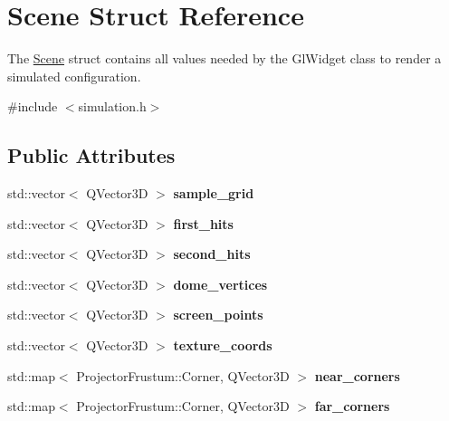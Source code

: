 \hypertarget{class_scene}{}\section{Scene Struct Reference}
\label{class_scene}


The \mbox{\hyperlink{class_scene}{Scene}} struct contains all values needed by the Gl\+Widget class to render a simulated configuration.  




{\ttfamily \#include $<$simulation.\+h$>$}

\subsection*{Public Attributes}
\begin{DoxyCompactItemize}
\item 
\mbox{\label{class_scene_ac73d19d8cf3309348b3302c607404b73}} 
std\+::vector$<$ Q\+Vector3D $>$ {\bfseries sample\+\_\+grid}
\item 
\mbox{\label{class_scene_ae9ef639317ddd27e4073a33b23e62810}} 
std\+::vector$<$ Q\+Vector3D $>$ {\bfseries first\+\_\+hits}
\item 
\mbox{\label{class_scene_acff925f0a3de398bcbeca5f51a32395c}} 
std\+::vector$<$ Q\+Vector3D $>$ {\bfseries second\+\_\+hits}
\item 
\mbox{\label{class_scene_aed6376924dbd14c550452dc9c8ba0341}} 
std\+::vector$<$ Q\+Vector3D $>$ {\bfseries dome\+\_\+vertices}
\item 
\mbox{\label{class_scene_a594e36de7f91ec97a3e9d08e05a339af}} 
std\+::vector$<$ Q\+Vector3D $>$ {\bfseries screen\+\_\+points}
\item 
\mbox{\label{class_scene_a6aacb490dbf456d4c5c4b6099aa10170}} 
std\+::vector$<$ Q\+Vector3D $>$ {\bfseries texture\+\_\+coords}
\item 
\mbox{\label{class_scene_a06d1a5251c4f51f8713be41c1a4cda1e}} 
std\+::map$<$ Projector\+Frustum\+::\+Corner, Q\+Vector3D $>$ {\bfseries near\+\_\+corners}
\item 
\mbox{\label{class_scene_a11c304f37b7373f14cf95e19a4b52c7b}} 
std\+::map$<$ Projector\+Frustum\+::\+Corner, Q\+Vector3D $>$ {\bfseries far\+\_\+corners}
\end{DoxyCompactItemize}


